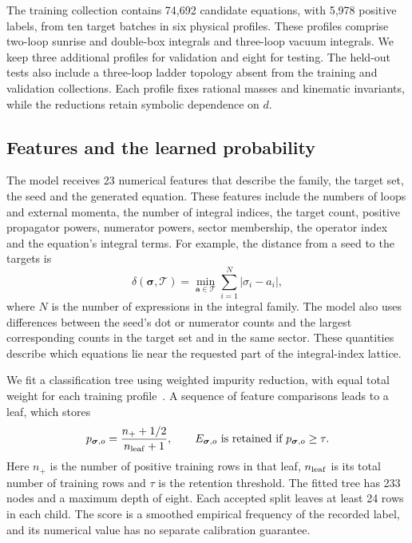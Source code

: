 The training collection contains 74,692 candidate equations, with
5,978 positive labels, from ten target batches in six physical profiles.
These profiles comprise two-loop sunrise and double-box integrals and
three-loop vacuum integrals. We keep three additional profiles for
validation and eight for testing. The held-out tests also include a
three-loop ladder topology absent from the training and validation
collections. Each profile fixes rational masses and kinematic invariants,
while the reductions retain symbolic dependence on $d$.

\subsection{Features and the learned probability}
The model receives 23 numerical features that describe the family,
the target set, the seed and the generated equation. These features include
the numbers of loops and external momenta, the number of integral indices,
the target count, positive propagator powers, numerator powers, sector
membership, the operator index and the equation's integral terms.
For example, the distance from a seed to the targets is
\begin{equation}
 \delta(\boldsymbol\sigma,\mathcal T)
 =\min_{\boldsymbol a\in\mathcal T}
   \sum_{i=1}^{N}|\sigma_i-a_i| ,
 \label{eq:equation-selection-distance}
\end{equation}
where $N$ is the number of expressions in the integral family.
The model also uses differences between the seed's dot or numerator
counts and the largest corresponding counts in the target set and
in the same sector. These quantities describe which equations lie near
the requested part of the integral-index lattice.

We fit a classification tree using weighted impurity reduction,
with equal total weight for each training profile~\cite{CART1984}.
A sequence of feature comparisons leads to a leaf, which stores
\begin{equation}
 p_{\boldsymbol\sigma,o}
 =\frac{n_+ + 1/2}{n_{\rm leaf}+1},
 \qquad
 E_{\boldsymbol\sigma,o}\ \hbox{is retained if}\
 p_{\boldsymbol\sigma,o}\geq\tau .
 \label{eq:equation-selection-probability}
\end{equation}
Here $n_+$ is the number of positive training rows in that leaf,
$n_{\rm leaf}$ is its total number of training rows and $\tau$ is
the retention threshold. The fitted tree has 233 nodes and a maximum
depth of eight. Each accepted split leaves at least 24 rows in each
child. The score is a smoothed empirical frequency of the recorded
label, and its numerical value has no separate calibration guarantee.

